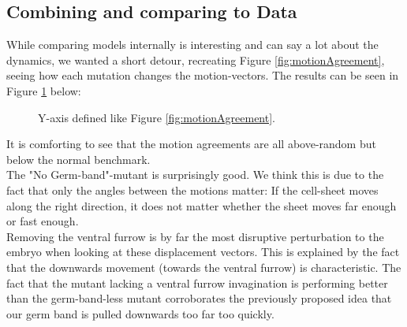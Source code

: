 \subsection{Combining and comparing to Data}
While comparing models internally is interesting and can say a lot about the dynamics, we wanted a short detour, recreating Figure \ref{fig:motionAgreement}, seeing how each mutation changes the motion-vectors. The results can be seen in Figure \ref{fig:compare-motionAgreement-time} below:

\begin{figure}[H]
    \centering
    \caption{ Y-axis defined like Figure \ref{fig:motionAgreement}. }
    \label{fig:compare-motionAgreement-time}
\end{figure}
It is comforting to see that the motion agreements are all above-random but below the normal benchmark.\\

The "No Germ-band"-mutant is surprisingly good. We think this is due to the fact that only the angles between the motions matter: If the cell-sheet moves along the right direction, it does not matter whether the sheet moves far enough or fast enough.\\

Removing the ventral furrow is by far the most disruptive perturbation to the embryo when looking at these displacement vectors. This is explained by the fact that the downwards movement (towards the ventral furrow) is characteristic. The fact that the mutant lacking a ventral furrow invagination is performing better than the germ-band-less mutant corroborates the previously proposed idea that our germ band is pulled downwards too far too quickly.\\

